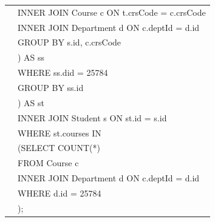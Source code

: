 \documentclass[11pt]{report}
\newcommand\tab[1][1cm]{\hspace*{#1}}
\begin{document}
\begin{flushleft}
\begin{tabular}{m{15em}|m{27.5em}}
			& \tab\tab INNER JOIN Course c ON t.crsCode = c.crsCode \\
			& \tab\tab INNER JOIN Department d ON c.deptId = d.id \\
			& \tab\tab GROUP BY s.id, c.crsCode \\
			& \tab\tab ) AS ss \\
			& \tab WHERE ss.did = 25784 \\
			& \tab GROUP BY ss.id \\
			& \tab ) AS st \\
			& INNER JOIN Student s ON st.id = s.id \\
			& WHERE st.courses IN \\
			& \tab (SELECT COUNT(*) \\
			& \tab FROM Course c \\
			& \tab INNER JOIN Department d ON c.deptId = d.id \\
			& \tab WHERE d.id = 25784 \\
			& \tab ); \\
		\end{tabular}
	\end{flushleft}

\newpage
\end{document}
